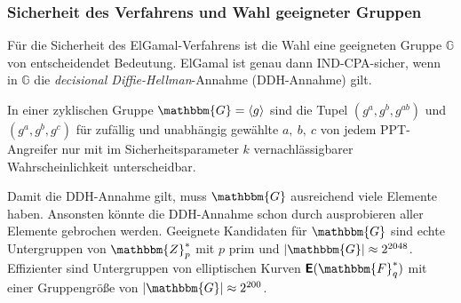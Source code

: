 \subsubsection{Sicherheit des Verfahrens und Wahl  geeigneter Gruppen}
Für die Sicherheit des ElGamal-Verfahrens ist die Wahl eine
geeigneten Gruppe $\mathbb{G}$ von entscheidendet Bedeutung. ElGamal ist genau
dann IND-CPA-sicher, wenn in $\mathbb{G}$ die \emph{decisional
  Diffie-Hellman}-Annahme \indexDecisionalDiffieHellman (DDH-Annahme) gilt.
\begin{definition}
In einer zyklischen Gruppe $\mathbbm{G} = \langle g \rangle$ sind die Tupel
$(g^a, g^b, g^{ab})$ und $(g^a, g^b, g^c)$ für zufällig und unabhängig
gewählte $a,~b,~c$ von jedem PPT-Angreifer nur mit im Sicherheitsparameter $k$ vernachlässigbarer
Wahrscheinlichkeit unterscheidbar.
\end{definition}

Damit die DDH-Annahme gilt, muss $\mathbbm{G}$ ausreichend viele
Elemente haben. Ansonsten könnte die DDH-Annahme schon durch
ausprobieren aller Elemente gebrochen werden. Geeignete Kandidaten für
$\mathbbm{G}$ sind echte Untergruppen von $\mathbbm{Z}^*_p$ mit $p$ prim
und $|\mathbbm{G}| \approx 2^{2048}$. Effizienter sind Untergruppen von
elliptischen Kurven $\boldsymbol{\mathsf{E}}(\mathbbm{F}^*_q)$ mit einer
Gruppengröße von $|\mathbbm{G}| \approx 2^{200}$.

